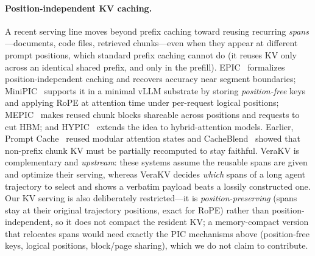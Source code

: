 \documentclass{article} %
\newcommand{\kvm}{VeraKV}
\begin{document}
\paragraph{Position-independent KV caching.}
A recent serving line moves beyond prefix caching toward reusing recurring
\emph{spans}---documents, code files, retrieved chunks---even when they appear at
different prompt positions, which standard prefix caching cannot do (it reuses KV
only across an identical shared prefix, and only in the prefill).
EPIC~\citep{epic} formalizes position-independent caching and recovers accuracy
near segment boundaries; MiniPIC~\citep{minipic} supports it in a minimal vLLM
substrate by storing \emph{position-free} keys and applying RoPE at attention time
under per-request logical positions; MEPIC~\citep{mepic} makes reused chunk blocks
shareable across positions and requests to cut HBM; and HYPIC~\citep{hypic}
extends the idea to hybrid-attention models. Earlier, Prompt
Cache~\citep{promptcache} reused modular attention states and
CacheBlend~\citep{cacheblend} showed that non-prefix chunk KV must be partially
recomputed to stay faithful. \kvm{} is complementary and \emph{upstream}: these
systems assume the reusable spans are given and optimize their serving, whereas
\kvm{} decides \emph{which} spans of a long agent trajectory to select and shows a
verbatim payload beats a lossily constructed one. Our KV serving is also
deliberately restricted---it is \emph{position-preserving} (spans stay at their
original trajectory positions, exact for RoPE) rather than position-independent,
so it does not compact the resident KV; a memory-compact version that relocates
spans would need exactly the PIC mechanisms above (position-free keys, logical
positions, block/page sharing), which we do not claim to contribute.
\end{document}
